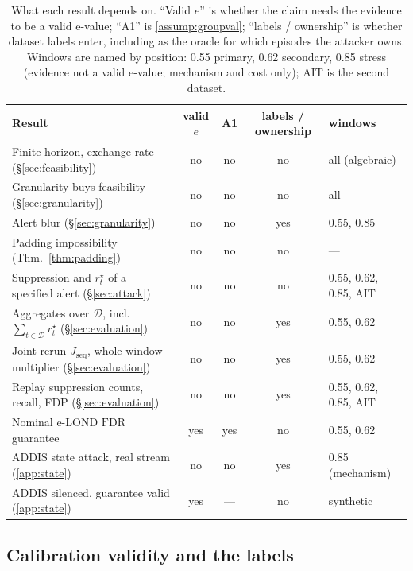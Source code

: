 \documentclass[conference]{IEEEtran}
\newcommand{\FDR}{\mathrm{FDR}}
\begin{document}
\begin{table}[t]
\centering
\caption{What each result depends on. ``Valid $e$'' is whether the claim needs the evidence to be a
valid e-value; ``A1'' is \cref{assump:groupval}; ``labels / ownership'' is whether dataset labels enter, including as
the oracle for which episodes the attacker owns. Windows
are named by position: 0.55 primary, 0.62 secondary, 0.85 stress (evidence not a valid e-value;
mechanism and cost only); AIT is the second dataset.}
\label{tab:scope}\label{tab:deps}
\footnotesize
\setlength{\tabcolsep}{4pt}
\begin{tabular}{@{}>{\raggedright\arraybackslash}p{8.2cm}cccp{3.0cm}@{}}
\toprule
Result & valid $e$ & A1 & labels / ownership & windows \\
\midrule
Finite horizon, exchange rate (\S\ref{sec:feasibility}) & no & no & no & all (algebraic) \\
Granularity buys feasibility (\S\ref{sec:granularity}) & no & no & no & all \\
Alert blur (\S\ref{sec:granularity}) & no & no & yes & 0.55, 0.85 \\
Padding impossibility (Thm.~\ref{thm:padding}) & no & no & no & --- \\
Suppression and $r^{\star}_t$ of a specified alert (\S\ref{sec:attack}) & no & no & no & 0.55, 0.62, 0.85, AIT \\
Aggregates over $\mathcal D$, incl.\ $\sum_{t\in\mathcal D} r^{\star}_t$ (\S\ref{sec:evaluation}) & no & no & yes & 0.55, 0.62 \\
Joint rerun $J_{\mathrm{seq}}$, whole-window multiplier (\S\ref{sec:evaluation}) & no & no & yes & 0.55, 0.62 \\
Replay suppression counts, recall, FDP (\S\ref{sec:evaluation}) & no & no & yes & 0.55, 0.62, 0.85, AIT \\
Nominal e-LOND $\FDR$ guarantee & yes & yes & no & 0.55, 0.62 \\
ADDIS state attack, real stream (\cref{app:state}) & no & no & yes & 0.85 (mechanism) \\
ADDIS silenced, guarantee valid (\cref{app:state}) & yes & --- & no & synthetic \\
\bottomrule
\end{tabular}
\end{table}

\subsection{Calibration validity and the labels}\label{sec:tail}
\end{document}
